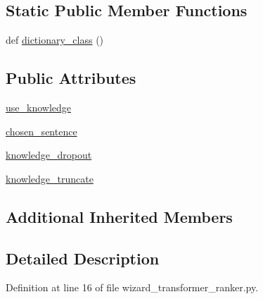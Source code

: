 \subsection*{Static Public Member Functions}
\begin{DoxyCompactItemize}
\item 
def \hyperlink{classprojects_1_1wizard__of__wikipedia_1_1wizard__transformer__ranker_1_1wizard__transformer__rad02f16524e5e0423aa3e2c69e1330ee1_a8e688fde0db811587679f5625ffdfb58}{dictionary\+\_\+class} ()
\end{DoxyCompactItemize}
\subsection*{Public Attributes}
\begin{DoxyCompactItemize}
\item 
\hyperlink{classprojects_1_1wizard__of__wikipedia_1_1wizard__transformer__ranker_1_1wizard__transformer__rad02f16524e5e0423aa3e2c69e1330ee1_a68ec02a7c1591b009ce87c0348fcad89}{use\+\_\+knowledge}
\item 
\hyperlink{classprojects_1_1wizard__of__wikipedia_1_1wizard__transformer__ranker_1_1wizard__transformer__rad02f16524e5e0423aa3e2c69e1330ee1_a51528c58413bd74f30fe8e728b919656}{chosen\+\_\+sentence}
\item 
\hyperlink{classprojects_1_1wizard__of__wikipedia_1_1wizard__transformer__ranker_1_1wizard__transformer__rad02f16524e5e0423aa3e2c69e1330ee1_ab5a2b64c750bc73f0aa8c39bc0ce1c28}{knowledge\+\_\+dropout}
\item 
\hyperlink{classprojects_1_1wizard__of__wikipedia_1_1wizard__transformer__ranker_1_1wizard__transformer__rad02f16524e5e0423aa3e2c69e1330ee1_a90a27dc83c6dd64cd1f1548617117f8e}{knowledge\+\_\+truncate}
\end{DoxyCompactItemize}
\subsection*{Additional Inherited Members}


\subsection{Detailed Description}


Definition at line 16 of file wizard\+\_\+transformer\+\_\+ranker.\+py.




